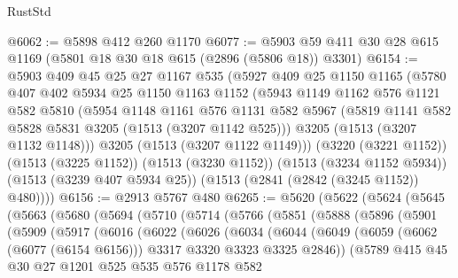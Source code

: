 \begin{lexlean}{RustStd}
\begin{coremodule}
@6062 := @5898 @412 @260 @1170
@6077 := @5903 @59 @411 @30 @28 @615 @1169 (@5801 @18 @30 @18 @615 (@2896 (@5806 @18)) @3301)
@6154 := @5903
    @409
    @45
    @25
    @27
    @1167
    @535
    (@5927
      @409
      @25
      @1150
      @1165
      (@5780
        @407
        @402
        @5934
        @25
        @1150
        @1163
        @1152
        (@5943
          @1149
          @1162
          @576
          @1121
          @582
          @5810
          (@5954
            @1148
            @1161
            @576
            @1131
            @582
            @5967
            (@5819 @1141 @582 @5828 @5831 @3205 (@1513 (@3207 @1142 @525)))
            @3205
            (@1513 (@3207 @1132 @1148)))
          @3205
          (@1513 (@3207 @1122 @1149)))
        (@3220 (@3221 @1152))
        (@1513 (@3225 @1152))
        (@1513 (@3230 @1152))
        (@1513 (@3234 @1152 @5934))
        (@1513 (@3239 @407 @5934 @25))
        (@1513 (@2841 (@2842 (@3245 @1152)) @480))))
@6156 := @2913 @5767 @480
@6265 := @5620
    (@5622
      (@5624
        (@5645
          (@5663
            (@5680
              (@5694
                (@5710
                  (@5714
                    (@5766
                      (@5851
                        (@5888
                          (@5896
                            (@5901
                              (@5909
                                (@5917
                                  (@6016
                                    (@6022
                                      (@6026
                                        (@6034
                                          (@6044
                                            (@6049
                                              (@6059
                                                (@6062 (@6077 (@6154 @6156)))
                                                @3317
                                                @3320
                                                @3323
                                                @3325
                                                @2846))
                                            (@5789
                                              @415
                                              @45
                                              @30
                                              @27
                                              @1201
                                              @525
                                              @535
                                              @576
                                              @1178
                                              @582

\end{coremodule}
\end{lexlean}

